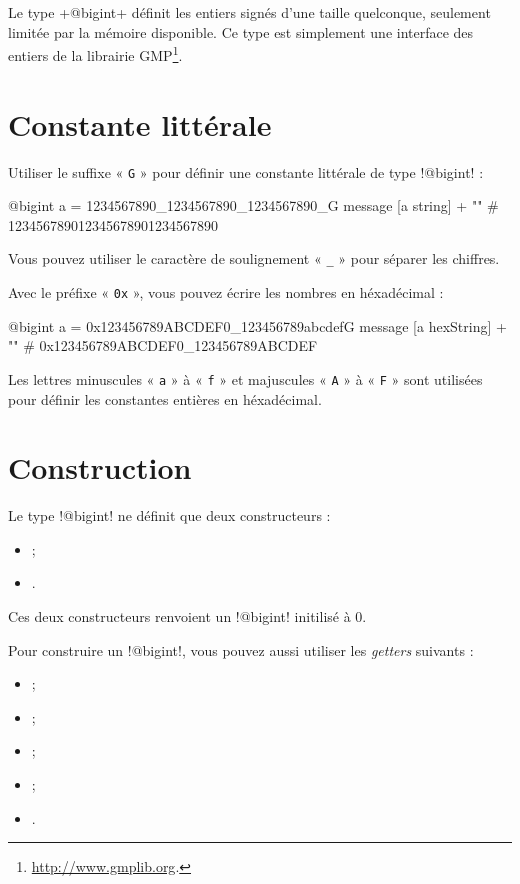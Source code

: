



Le type \ggsq+@bigint+ définit les entiers signés d'une taille quelconque, seulement limitée par la mémoire disponible. Ce type est simplement une interface des entiers de la librairie GMP\footnote{\url{http://www.gmplib.org}.}.

\section{Constante littérale}

Utiliser le suffixe « \texttt{G} » pour définir une constante littérale de type \ggsq!@bigint! :
\begin{galgas4}
@bigint a = 1234567890_1234567890_1234567890_G
message [a string] + "\n" # 123456789012345678901234567890
\end{galgas4}

Vous pouvez utiliser le caractère de soulignement « \texttt{\_} » pour séparer les chiffres.

Avec le préfixe « \texttt{0x} », vous pouvez écrire les nombres en héxadécimal :
\begin{galgas4}
@bigint a = 0x123456789ABCDEF0_123456789abcdefG
message [a hexString] + "\n" # 0x123456789ABCDEF0_123456789ABCDEF
\end{galgas4}

Les lettres minuscules « \texttt{a} » à « \texttt{f} » et majuscules « \texttt{A} » à « \texttt{F} » sont utilisées pour définir les constantes entières en héxadécimal.

\section{Construction}

Le type \ggsq!@bigint! ne définit que deux constructeurs :
\begin{itemize}
  \item {} ;
  \item {}.
\end{itemize}

Ces deux constructeurs renvoient un \ggsq!@bigint! initilisé à $0$.

Pour construire un \ggsq!@bigint!, vous pouvez aussi utiliser les \emph{getters} suivants :
\begin{itemize}
  \item {} ;
  \item {} ;
  \item {} ;
  \item {} ;
  \item {}.
\end{itemize}

